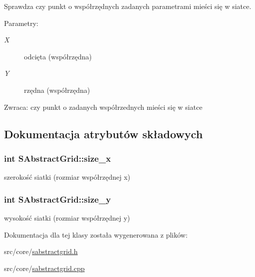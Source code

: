 Sprawdza czy punkt o współrzędnych zadanych parametrami mieści się w siatce. \begin{Desc}
\item[Parametry:]
\begin{description}
\item[{\em X}]odcięta (współrzędna) \item[{\em Y}]rzędna (współrzędna) \end{description}
\end{Desc}
\begin{Desc}
\item[Zwraca:]czy punkt o zadanych współrzednych mieści się w siatce \end{Desc}


\subsection{Dokumentacja atrybutów składowych}
\hypertarget{classSAbstractGrid_f0b1916fda47bbd921fc1b5b5abadb72}{
\subsubsection[{size\_\-x}]{\setlength{\rightskip}{0pt plus 5cm}int {\bf SAbstractGrid::size\_\-x}}}
\label{classSAbstractGrid_f0b1916fda47bbd921fc1b5b5abadb72}


szerokość siatki (rozmiar współrzędnej x) \hypertarget{classSAbstractGrid_b9fddbe2004e7242dff69aa20da8a3c3}{
\subsubsection[{size\_\-y}]{\setlength{\rightskip}{0pt plus 5cm}int {\bf SAbstractGrid::size\_\-y}}}
\label{classSAbstractGrid_b9fddbe2004e7242dff69aa20da8a3c3}


wysokość siatki (rozmiar współrzędnej y) 

Dokumentacja dla tej klasy została wygenerowana z plików:\begin{CompactItemize}
\item 
src/core/\hyperlink{sabstractgrid_8h}{sabstractgrid.h}\item 
src/core/\hyperlink{sabstractgrid_8cpp}{sabstractgrid.cpp}\end{CompactItemize}

